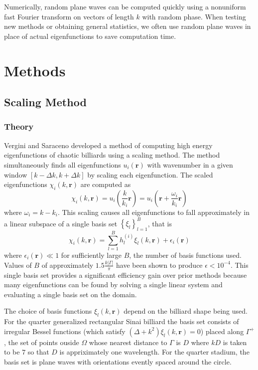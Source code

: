 \documentclass{report}
\newcommand{\rr}[0]{\mathbf{r}}
\begin{document}
Numerically, random plane waves can be computed quickly using a nonuniform fast Fourier transform on vectors of length $k$ with random phase. When testing new methods or obtaining general statistics, we often use random plane waves in place of actual eigenfunctions to save computation time.

\chapter{Methods}
\section{Scaling Method}
\label{sec:scaling_method}
\subsection{Theory}
Vergini and Saraceno \cite{vergini} developed a method of computing high energy eigenfunctions of chaotic billiards using a scaling method. The method simultaneously finds all eigenfunctions $u_{i}(\rr)$ with wavenumber in a given window $[k - \Delta k, k + \Delta k]$ by scaling each eigenfunction. The scaled eigenfunctions $\chi_{i}(k, \rr)$ are computed as
\[
\chi_{i}(k, \rr) = u_{i} \left( \frac{k}{k_{i}} \rr \right) = u_{i} \left( \rr + \frac{\omega_{i}}{k_i} \rr \right)
\]
where $\omega_{i} = k - k_i$. This scaling causes all eigenfunctions to fall approximately in a linear subspace of a single basis set $\left\{ \xi_{l} \right\}_{l=1}^{B}$, that is
\[
\chi_{i}(k, \rr) = \sum_{l=1}^{B} h_{l}^{(i)} \xi_{l}(k, \rr) + \epsilon_{i}(\rr)
\]
where $\epsilon_{i}(\rr) \ll 1$ for sufficiently large $B$, the number of basis functions used. Values of $B$ of approximately $1.5 \frac{k \vert \Gamma \vert}{\pi}$ have been shown to produce $\epsilon < 10^{-4}$. This single basis set provides a significant efficiency gain over prior methods because many eigenfunctions can be found by solving a single linear system and evaluating a single basis set on the domain.

The choice of basis functions $\xi_{l}(k, \rr)$ depend on the billiard shape being used. For the quarter generalized rectangular Sinai billiard the basis set consists of irregular Bessel functions (which satisfy $(\Delta + k^2)\xi_{l}(k, \rr) = 0$) placed along $\Gamma^{+}$, the set of points ouside $\Omega$ whose nearest distance to $\Gamma$ is $D$ where $kD$ is taken to be $7$ so that $D$ is appriximately one wavelength. For the quarter stadium, the basis set is plane waves with orientations evently spaced around the circle.
\end{document}
